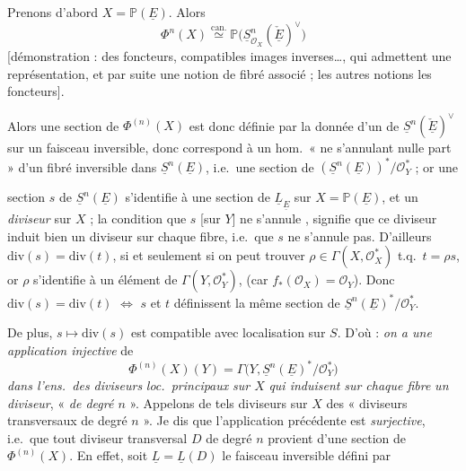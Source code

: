 \documentclass[11pt,a4paper]{article}
\begin{document}
Prenons d'abord $X = \mathbb{P}(\underline{E})$. Alors
\[
  \Phi^{n}(X) \overset{\text{can.}}{\simeq}
  \mathbb{P}\bigl(\underline{S}^{n}_{\mathcal{O}_X}(\check{\underline{E}})^{\vee}\bigr)
\]
[démonstration : \ill{} \ill{} \ill{} \ill{} des foncteurs, compatibles
 images inverses\ldots, qui admettent une représentation, et
par suite une notion de fibré associé ; les autres  notions
  \ill{} \ill{} les foncteurs].

 Alors une section de $\Phi^{(n)}(X)$ est donc
définie par \struck{\ill{}} la donnée d'un \struck{\ill{}}
  de
$\underline{S}^{n}(\check{\underline{E}})^{\vee}$ sur un \struck{\ill{}}
faisceau inversible, donc correspond à un hom.\ « ne s'annulant
nulle part » d'un fibré inversible dans $\underline{S}^{n}(\underline{E})$,
i.e.\ une section de
\struck{\ill{}} $(\underline{S}^{n}(\underline{E}))^{*}/\mathcal{O}_Y^{*}$ ; or une


section $s$ de $\underline{S}^{n}(\underline{E})$ s'identifie à une section de
$\underline{L}_{\underline{E}}$ sur $X = \mathbb{P}(\underline{E})$, et
\struck{\ill{}}  \struck{\ill{}} un \emph{diviseur}
 \struck{\ill{}} sur $X$ ; la condition que $s$
[sur $Y$] ne s'annule \emph{}, signifie que ce diviseur
induit bien un diviseur sur chaque fibre, \struck{\ill{}} i.e.\ que $s$ ne
s'annule pas. D'ailleurs \struck{\ill{} \ill{}} $\mathrm{div}(s) =
\mathrm{div}(t)$, \struck{\ill{}} si et seulement si on peut trouver
$\rho \in \Gamma(X, \mathcal{O}_X^{*})$ t.q.\ $t = \rho s$, or $\rho$
s'identifie à un élément de $\Gamma(Y, \mathcal{O}_Y^{*})$,
(car $f_{*}(\mathcal{O}_X) = \mathcal{O}_Y$). Donc $\mathrm{div}(s) =
\mathrm{div}(t)$ $\Longleftrightarrow$ $s$ et $t$ définissent la même section
de $\underline{S}^{n}(\underline{E})^{*}/\mathcal{O}_Y^{*}$.

De plus, $s \mapsto \mathrm{div}(s)$ est compatible avec localisation sur $S$.
D'où : \emph{on a une application injective} de
\[
  \Phi^{(n)}(X)(Y) = \Gamma\bigl(Y, \underline{S}^{n}(\underline{E})^{*}/\mathcal{O}_Y^{*}\bigr)
\]
\emph{dans l'ens.\ des diviseurs} \emph{loc.\ principaux} 
\emph{sur $X$} \emph{qui induisent}  \emph{sur chaque
fibre} \emph{un diviseur}, «  \emph{de degré $n$} ».
Appelons de tels diviseurs sur $X$ des « diviseurs transversaux de degré $n$ ».
Je dis que l'application précédente est \emph{surjective}, i.e.\ que tout
diviseur transversal $D$ de degré $n$ provient d'une section de
$\Phi^{(n)}(X)$. En effet, soit $\underline{L} = \underline{L}(D)$ le faisceau
inversible défini par
\end{document}
